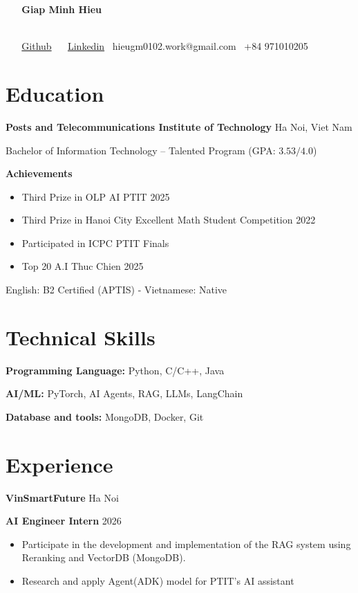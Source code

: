 \documentclass[11pt]{article}
\newcommand{\cvsection}[1]{%
    \vspace{5pt}
    \section*{#1}%
    \hrulefill
    \vspace{5pt}
}
\begin{document}

\begin{center}
    \textbf{\Large Giap Minh Hieu}\\ 
    \hrulefill
\end{center}

\begin{center}
    \href{https://github.com/HieuGM}{Github} \textbullet   \href{https://www.linkedin.com/in/minh-hi%E1%BA%BFu-gi%C3%A1p-39149635a/}{Linkedin} \textbullet \ hieugm0102.work@gmail.com \textbullet \ +84 971010205
\end{center}

\cvsection{Education}

\textbf{Posts and Telecommunications Institute of Technology} \hfill Ha Noi, Viet Nam

Bachelor of Information Technology -- Talented Program (GPA: $3.53/4.0$)

\textbf{Achievements}
\begin{itemize}[noitemsep, topsep=1pt, partopsep=0pt, parsep=0pt, leftmargin=15pt]
    \item Third Prize in OLP AI PTIT 2025
    \item Third Prize in Hanoi City Excellent Math Student Competition 2022
    \item Participated in ICPC PTIT Finals
    \item Top 20 A.I Thuc Chien 2025
\end{itemize}

English: B2 Certified (APTIS) - Vietnamese: Native

\cvsection{Technical Skills}

\textbf{Programming Language:} Python, C/C++, Java

\textbf{AI/ML:} PyTorch, AI Agents, RAG, LLMs, LangChain

\textbf{Database and tools:} MongoDB, Docker, Git

\cvsection{Experience}

\textbf{VinSmartFuture} \hfill Ha Noi

\textbf{AI Engineer Intern} \hfill 2026
\begin{itemize}[noitemsep, topsep=0pt, partopsep=0pt, parsep=0pt]
\item Participate in the development and implementation of the RAG system using Reranking and VectorDB (MongoDB).
\item Research and apply Agent(ADK) model for PTIT's AI assistant

\end{itemize}
\end{document}
